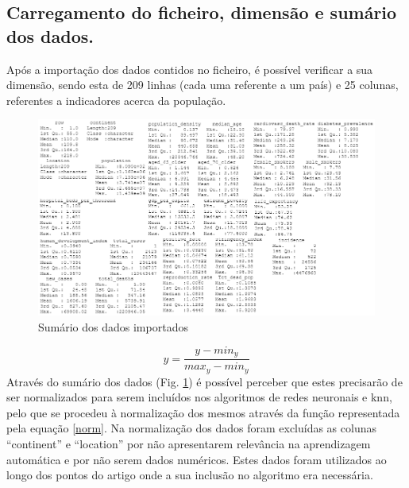 \documentclass[conference]{IEEEtran}
\begin{document}
\subsection{Carregamento do ficheiro, dimensão e sumário dos dados.} 
\label{ex01}
Após a importação dos dados contidos no ficheiro, é possível verificar a sua dimensão, sendo esta de 209 linhas (cada uma referente a um país) e 25 colunas, referentes a indicadores acerca da população.
\begin{figure}[htbp]
\centerline{\includegraphics[width=0.95\columnwidth]{images/01.png}}
\caption{Sumário dos dados importados}
\label{summary}
\end{figure}
\begin{equation}
y = \frac{y-min_{y}}{max_{y}-min_{y}} \label{norm}
\end{equation}
Através do sumário dos dados (Fig. \ref{summary}) é possível perceber que estes precisarão de ser normalizados para serem incluídos nos algoritmos de redes neuronais e knn, pelo que se procedeu à normalização dos mesmos através da função representada pela equação \eqref{norm}.
Na normalização dos dados foram excluídas as colunas “continent” e “location” por não apresentarem relevância na aprendizagem automática e por não serem dados numéricos. Estes dados foram utilizados ao longo dos pontos do artigo onde a sua inclusão no algoritmo era necessária.
\end{document}
